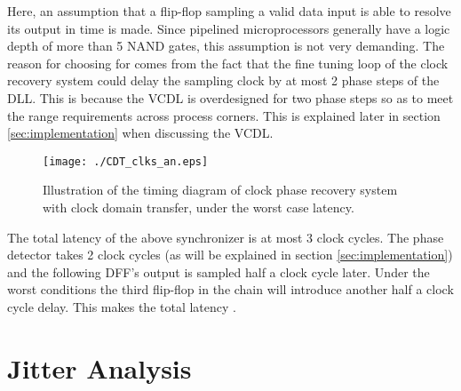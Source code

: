 \documentclass[journal,twoside,letterpaper]{IEEEtran}
\begin{document}
Here, an assumption that a flip-flop sampling a valid
data input is able to resolve its output in time
 is made. Since pipelined
microprocessors generally have a logic depth of more than 
5 NAND gates, this assumption is not very demanding.
The reason for choosing 
for  comes from the fact that the
fine tuning loop of the clock recovery
system could delay the sampling clock by at most
2 phase steps of the DLL. This is because the VCDL 
is overdesigned for two phase steps so as to meet the 
range requirements across process corners.
This is explained later in section \ref{sec:implementation} when discussing the VCDL.
\begin{figure}[h!]
\centering
{}
\texttt{[image: ./CDT\_clks\_an.eps]}
\caption{Illustration of the timing diagram of clock phase recovery system
with clock domain transfer, under the worst case
latency.}
\label{fig:cdt_ck_an}
\end{figure}
The total latency of the above synchronizer is
at most 3 clock cycles. The phase detector takes 2
clock cycles (as will be explained in section \ref{sec:implementation})
 and the following DFF's
output is sampled half a clock cycle later.
Under the worst conditions the third flip-flop 
in the chain will introduce another
half a clock cycle delay. This makes the
total latency .

\section{Jitter Analysis}
\label{sec:jitter}
\end{document}
